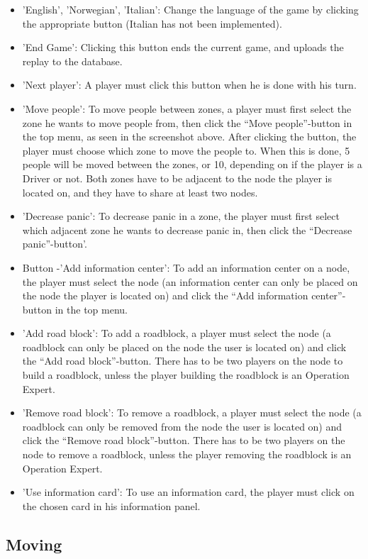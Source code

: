 \begin{itemize}
\item 'English', 'Norwegian', 'Italian': Change the language of the game by clicking the appropriate button (Italian has not been implemented).
\item 'End Game': Clicking this button ends the current game, and uploads the replay to the database.
\item 'Next player': A player must click this button when he is done with his turn.
\item 'Move people': To move people between zones, a player must first select the zone he wants to move people from, then click the “Move people”-button in the top menu, as seen in the screenshot above. After clicking the button, the player must choose which zone to move the people to. When this is done, 5 people will be moved between the zones, or 10, depending on if the player is a Driver or not. Both zones have to be adjacent to the node the player is located on, and they have to share at least two nodes.
\item 'Decrease panic': To decrease panic in a zone, the player must first select which adjacent zone he wants to decrease panic in, then click the “Decrease panic”-button'.
\item Button -'Add information center': To add an information center on a node, the player must select the node (an information center can only be placed on the node the player is located on) and click the “Add information center”-button in the top menu.
\item 'Add road block': To add a roadblock, a player must select the node (a roadblock can only be placed on the node the user is located on) and click the “Add road block”-button. There has to be two players on the node to build a roadblock, unless the player building the roadblock is an Operation Expert.
\item 'Remove road block': To remove a roadblock, a player must select the node (a roadblock can only be removed from the node the user is located on) and click the “Remove road block”-button. There has to be two players on the node to remove a roadblock, unless the player removing the roadblock is an Operation Expert.
\item 'Use information card': To use an information card, the player must click on the chosen card in his information panel.
\end{itemize}

\subsection*{Moving}

